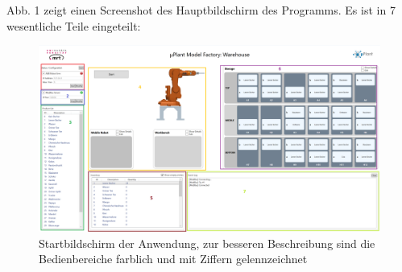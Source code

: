         Abb. 1 zeigt einen Screenshot des Hauptbildschirm des Programms. Es ist in 7 wesentliche Teile eingeteilt:
    \begin{figure}[h]
        \label{fig:figure}
        \includegraphics[width = \textwidth ]{Bilder/LV_Startbildschirm}
        \caption[Ansicht des Startbildschirms]%
        {\small Startbildschirm der Anwendung, zur besseren Beschreibung sind die Bedienbereiche farblich und mit Ziffern gelennzeichnet}
        \centering
    \end{figure}

